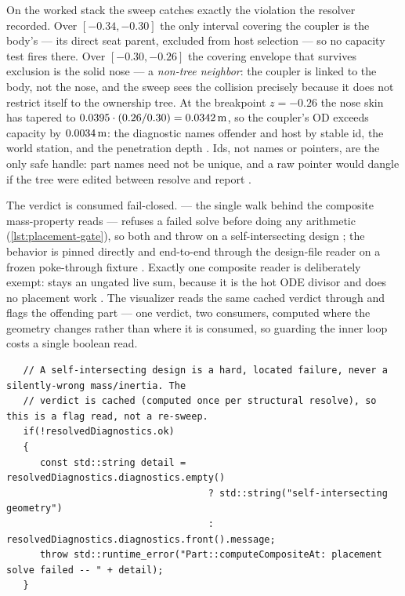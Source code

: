 On the worked stack the sweep catches exactly the violation the resolver recorded. Over
$[-0.34, -0.30]$ the only interval covering the coupler is the body's --- its direct seat
parent, excluded from host selection --- so no capacity test fires there. Over
$[-0.30, -0.26]$ the covering envelope that survives exclusion is the solid nose --- a \emph{non-tree
neighbor}: the coupler is linked to the body, not the nose, and the sweep sees the
collision precisely because it does not restrict itself to the ownership tree. At the
breakpoint $z=-0.26$ the nose skin has tapered to $0.0395 \cdot (0.26/0.30) =
0.0342\,\mathrm{m}$, so the coupler's OD exceeds capacity by $0.0034\,\mathrm{m}$: the diagnostic names
offender and host by stable id, the world station, and the penetration depth
. Ids, not names or pointers, are the only
safe handle: part names need not be unique, and a raw pointer would dangle if the tree
were edited between resolve and report .

The verdict is consumed fail-closed.  --- the single walk behind
the composite mass-property reads --- refuses a failed solve before doing any arithmetic
(\cref{lst:placement-gate}), so both  and 
throw on a self-intersecting design ; the behavior is
pinned directly  and end-to-end through the
design-file reader on a frozen poke-through fixture
. Exactly one composite reader is
deliberately exempt:  stays an ungated live sum, because it is
the hot ODE divisor and does no placement work
. The visualizer reads the same cached
verdict through   and flags the
offending part  --- one verdict, two consumers,
computed where the geometry changes rather than where it is consumed, so guarding the
inner loop costs a single boolean read.

\begin{listing}[htbp]
\begin{verbatim}
   // A self-intersecting design is a hard, located failure, never a silently-wrong mass/inertia. The
   // verdict is cached (computed once per structural resolve), so this is a flag read, not a re-sweep.
   if(!resolvedDiagnostics.ok)
   {
      const std::string detail = resolvedDiagnostics.diagnostics.empty()
                                    ? std::string("self-intersecting geometry")
                                    : resolvedDiagnostics.diagnostics.front().message;
      throw std::runtime_error("Part::computeCompositeAt: placement solve failed -- " + detail);
   }
\end{verbatim}
\caption{The fail-closed gate at the top of the composite walk
: the thrown error carries the first located diagnostic,
so the caller learns who intruded into what, where, and by how much.}
\label{lst:placement-gate}
\end{listing}

